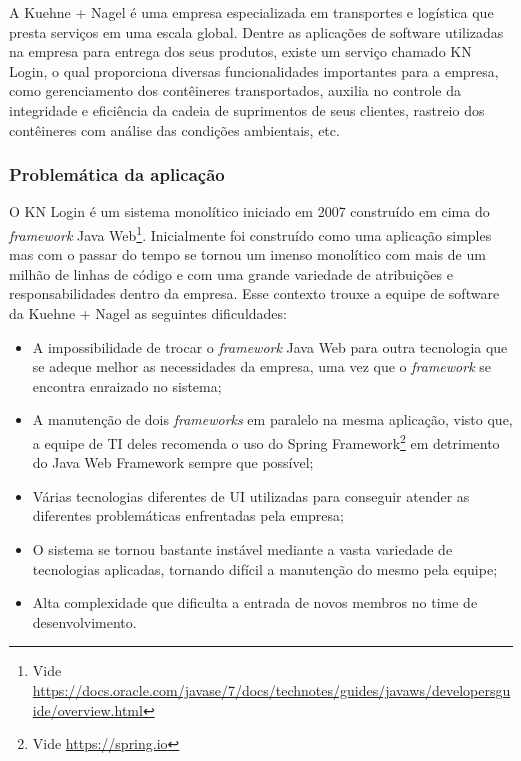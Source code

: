 A Kuehne + Nagel é uma empresa especializada em transportes e logística que presta serviços em uma
escala global. Dentre as aplicações de software utilizadas na empresa para entrega dos seus
produtos, existe um serviço chamado KN Login, o qual proporciona diversas funcionalidades
importantes para a empresa, como gerenciamento dos contêineres transportados, auxilia no controle da
integridade e eficiência da cadeia de suprimentos de seus clientes, rastreio dos contêineres com
análise das condições ambientais, etc.

\subsubsection{Problemática da aplicação}

O KN Login é um sistema monolítico iniciado em 2007 construído em cima do \textit{framework}
Java Web\footnote{Vide \url{https://docs.oracle.com/javase/7/docs/technotes/guides/javaws/developersguide/overview.html}}.
Inicialmente foi construído como uma aplicação simples mas com o passar do tempo se tornou um imenso
monolítico com mais de um milhão de linhas de código e com uma grande variedade de atribuições e
responsabilidades dentro da empresa. Esse contexto trouxe a equipe de software da Kuehne + Nagel as
seguintes dificuldades:

\begin{itemize}
    \item A impossibilidade de trocar o \textit{framework} Java Web para outra tecnologia que se
        adeque melhor as necessidades da empresa, uma vez que o \textit{framework} se encontra enraizado no sistema;
    \item A manutenção de dois \textit{frameworks} em paralelo na mesma aplicação, visto que, a
    equipe de \gls{TI} deles recomenda o uso do Spring Framework\footnote{Vide \url{https://spring.io}} em
    detrimento do Java Web Framework sempre que possível;
    \item Várias tecnologias diferentes de \gls{UI} utilizadas para conseguir atender as diferentes
    problemáticas enfrentadas pela empresa;
    \item O sistema se tornou bastante instável mediante a vasta variedade de tecnologias aplicadas,
    tornando difícil a manutenção do mesmo pela equipe;
    \item Alta complexidade que dificulta a entrada de novos membros no time de desenvolvimento.
\end{itemize}

